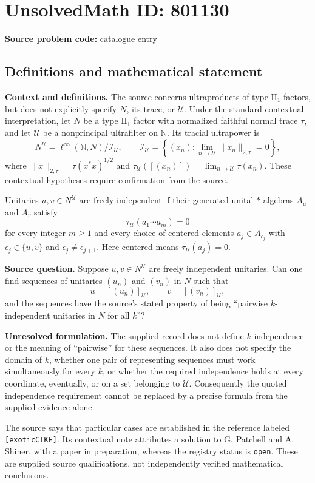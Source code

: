 \documentclass[11pt]{article}
\begin{document}
\section*{UnsolvedMath ID: 801130}
\textbf{Source problem code:} catalogue entry
\subsection{Definitions and mathematical statement}
\textbf{Context and definitions.} The source concerns ultraproducts of type $\mathrm{II}_1$ factors, but does not explicitly specify $N$, its trace, or $\mathcal U$. Under the standard contextual interpretation, let $N$ be a type $\mathrm{II}_1$ factor with normalized faithful normal trace $\tau$, and let $\mathcal U$ be a nonprincipal ultrafilter on $\mathbb N$. Its tracial ultrapower is
\[
N^{\mathcal U}=\ell^\infty(\mathbb N,N)\big/\mathcal I_{\mathcal U},\qquad
\mathcal I_{\mathcal U}=\left\{(x_n):\lim_{n\to\mathcal U}\|x_n\|_{2,\tau}=0\right\},
\]
where $\|x\|_{2,\tau}=\tau(x^*x)^{1/2}$ and $\tau_{\mathcal U}([(x_n)])=\lim_{n\to\mathcal U}\tau(x_n)$. These contextual hypotheses require confirmation from the source.

Unitaries $u,v\in N^{\mathcal U}$ are freely independent if their generated unital $*$-algebras $A_u$ and $A_v$ satisfy
\[
\tau_{\mathcal U}(a_1\cdots a_m)=0
\]
for every integer $m\geq 1$ and every choice of centered elements $a_j\in A_{\epsilon_j}$ with $\epsilon_j\in\{u,v\}$ and $\epsilon_j\ne\epsilon_{j+1}$. Here centered means $\tau_{\mathcal U}(a_j)=0$.

\textbf{Source question.} Suppose $u,v\in N^{\mathcal U}$ are freely independent unitaries. Can one find sequences of unitaries $(u_n)$ and $(v_n)$ in $N$ such that
\[
u=[(u_n)]_{\mathcal U},\qquad v=[(v_n)]_{\mathcal U},
\]
and the sequences have the source's stated property of being ``pairwise $k$-independent unitaries in $N$ for all $k$''?

\textbf{Unresolved formulation.} The supplied record does not define $k$-independence or the meaning of ``pairwise'' for these sequences. It also does not specify the domain of $k$, whether one pair of representing sequences must work simultaneously for every $k$, or whether the required independence holds at every coordinate, eventually, or on a set belonging to $\mathcal U$. Consequently the quoted independence requirement cannot be replaced by a precise formula from the supplied evidence alone.

The source says that particular cases are established in the reference labeled \texttt{[exoticCIKE]}. Its contextual note attributes a solution to G. Patchell and A. Shiner, with a paper in preparation, whereas the registry status is \texttt{open}. These are supplied source qualifications, not independently verified mathematical conclusions.
\end{document}

